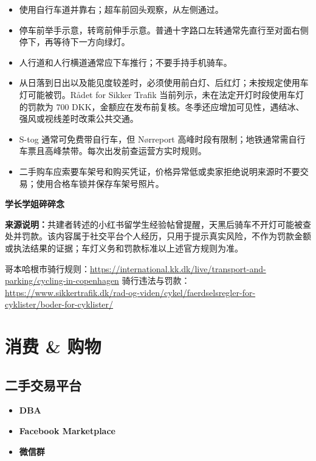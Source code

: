 \begin{itemize}[leftmargin=2em,itemsep=3pt]
  \item 使用自行车道并靠右；超车前回头观察，从左侧通过。
  \item 停车前举手示意，转弯前伸手示意。普通十字路口左转通常先直行至对面右侧停下，再等待下一方向绿灯。
  \item 人行道和人行横道通常应下车推行；不要手持手机骑车。
  \item 从日落到日出以及能见度较差时，必须使用前白灯、后红灯；未按规定使用车灯可能被罚。Rådet for Sikker Trafik 当前列示，未在法定开灯时段使用车灯的罚款为 700 DKK，金额应在发布前复核。冬季还应增加可见性，遇结冰、强风或视线差时改乘公共交通。
  \item S-tog 通常可免费带自行车，但 Nørreport 高峰时段有限制；地铁通常需自行车票且高峰禁带。每次出发前查运营方实时规则。
  \item 二手购车应索要车架号和购买凭证，价格异常低或卖家拒绝说明来源时不要交易；使用合格车锁并保存车架号照片。
\end{itemize}

\begin{grayleftbox}\textbf{学长学姐碎碎念}
\experiencenotice

\textbf{来源说明：}共建者转述的小红书留学生经验帖曾提醒，天黑后骑车不开灯可能被查处并罚款。该内容属于社交平台个人经历，只用于提示真实风险，不作为罚款金额或执法结果的证据；车灯义务和罚款标准以上述官方规则为准。
\end{grayleftbox}

哥本哈根市骑行规则：\url{https://international.kk.dk/live/transport-and-parking/cycling-in-copenhagen}
骑行违法与罚款：\url{https://www.sikkertrafik.dk/rad-og-viden/cykel/faerdselsregler-for-cyklister/boder-for-cyklister/}

\section{消费 \& 购物}

\subsection{二手交易平台}
\begin{itemize}
  \item \textbf{DBA}
  \item \textbf{Facebook Marketplace}
  \item \textbf{微信群}
\end{itemize}

